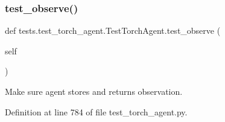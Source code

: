 \subsubsection{\texorpdfstring{test\+\_\+observe()}{test\_observe()}}
{\footnotesize\ttfamily def tests.\+test\+\_\+torch\+\_\+agent.\+Test\+Torch\+Agent.\+test\+\_\+observe (\begin{DoxyParamCaption}\item[{}]{self }\end{DoxyParamCaption})}

\begin{DoxyVerb}Make sure agent stores and returns observation.
\end{DoxyVerb}
 

Definition at line 784 of file test\+\_\+torch\+\_\+agent.\+py.


